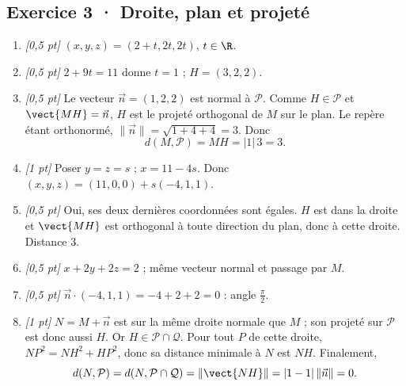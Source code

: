 \subsection*{Exercice 3 · Droite, plan et projeté}\begin{enumerate}

\item \textit{[0,5 pt]} $(x,y,z)=(2+t,2t,2t)$, $t\in\R$.

\item \textit{[0,5 pt]} $2+9t=11$ donne $t=1$ ; $H=(3,2,2)$.

\item \textit{[0,5 pt]} Le vecteur $\vec n=(1,2,2)$ est normal à $\mathcal P$. Comme $H\in\mathcal P$ et $\vect{MH}=\vec n$, $H$ est le projeté orthogonal de $M$ sur le plan. Le repère étant orthonormé, $\|\vec n\|=\sqrt{1+4+4}=3$. Donc
\[d(M,\mathcal P)=MH=|1|\,3=3.\]

\item \textit{[1 pt]} Poser $y=z=s$ ; $x=11-4s$. Donc $(x,y,z)=(11,0,0)+s(-4,1,1)$.

\item \textit{[0,5 pt]} Oui, ses deux dernières coordonnées sont égales. $H$ est dans la droite et $\vect{MH}$ est orthogonal à toute direction du plan, donc à cette droite. Distance $3$.

\item \textit{[0,5 pt]} $x+2y+2z=2$ ; même vecteur normal et passage par $M$.

\item \textit{[0,5 pt]} $\vec n\cdot(-4,1,1)=-4+2+2=0$ : angle $\frac{\pi}{2}$.

\item \textit{[1 pt]} $N=M+\vec n$ est sur la même droite normale que $M$ ; son projeté sur $\mathcal P$ est donc aussi $H$. Or $H\in\mathcal P\cap\mathcal Q$. Pour tout $P$ de cette droite, $NP^2=NH^2+HP^2$, donc sa distance minimale à $N$ est $NH$. Finalement,
\[d(N,\mathcal P)=d(N,\mathcal P\cap\mathcal Q)=\|\vect{NH}\|=|1-1|\,\|\vec n\|=0.\]

\end{enumerate}


